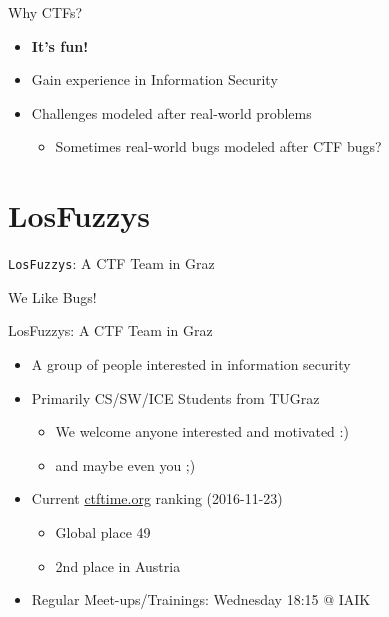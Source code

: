 \begin{frame}
  {Why CTFs?}

  \begin{itemize}
    \item \textbf{It's fun!}
    \item Gain experience in Information Security
    \item Challenges modeled after real-world problems
      \begin{itemize}
        \item Sometimes real-world bugs modeled after CTF bugs?
      \end{itemize}
  \end{itemize}
\end{frame}

\section{LosFuzzys}

{
\begin{frame}

  {\huge
    \texttt{LosFuzzys}: A CTF Team in Graz}

  \vspace{19em}

  {\Large
  We Like Bugs!}

\end{frame}
}

\begin{frame}
  {LosFuzzys: A CTF Team in Graz}

  \begin{itemize}
    \item A group of people interested in information security
    \item Primarily CS/SW/ICE Students from TUGraz
      \begin{itemize}
        \item We welcome anyone interested and motivated :)
        \item and maybe even you ;)
      \end{itemize}
    \item Current \href{https://ctftime.org/team/8323}{ctftime.org} ranking
      (2016-11-23)
      \begin{itemize}
        \item Global place 49
        \item 2nd place in Austria
      \end{itemize}
    \item Regular Meet-ups/Trainings: Wednesday 18:15 @ IAIK
  \end{itemize}
\end{frame}



